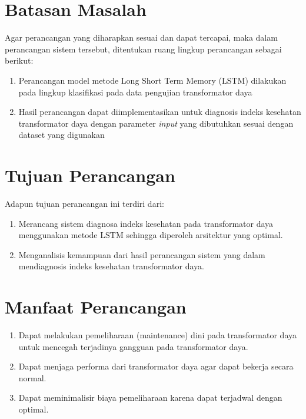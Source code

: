 
\section{Batasan Masalah}
Agar perancangan yang diharapkan sesuai dan dapat tercapai, maka dalam perancangan sistem tersebut, ditentukan ruang lingkup perancangan sebagai berikut:
\begin{enumerate}
	\item Perancangan model metode Long Short Term Memory (LSTM) dilakukan pada lingkup klasifikasi pada data pengujian transformator daya
	\item Hasil perancangan dapat diimplementasikan untuk diagnosis indeks kesehatan transformator daya dengan parameter \textit{input} yang dibutuhkan sesuai dengan dataset yang digunakan
\end{enumerate}

\section{Tujuan Perancangan}
Adapun tujuan perancangan ini terdiri dari:
\begin{enumerate}
	\item Merancang sistem diagnosa indeks kesehatan pada transformator daya menggunakan metode LSTM sehingga diperoleh arsitektur yang optimal.
	\item Menganalisis kemampuan dari hasil perancangan sistem yang dalam mendiagnosis indeks kesehatan transformator daya.
\end{enumerate}


\section{Manfaat Perancangan}
\begin{enumerate}
	\item Dapat melakukan pemeliharaan (maintenance) dini pada transformator daya untuk mencegah terjadinya gangguan pada transformator daya.
	\item Dapat menjaga performa dari transformator daya agar dapat bekerja secara normal.
	\item Dapat meminimalisir biaya pemeliharaan karena dapat terjadwal dengan optimal.
\end{enumerate}

